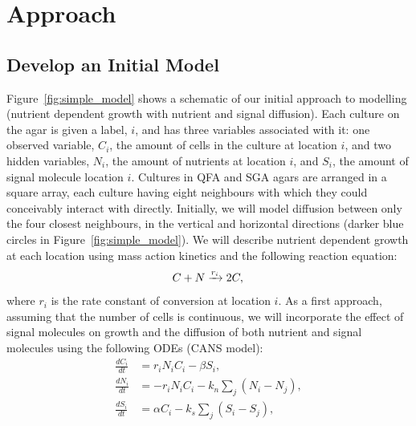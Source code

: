 \graphicspath{{images_low_res/}}
\section{Approach}
\label{sec:approach}

\subsection{Develop an Initial Model}
\label{sec:initial_model}



Figure~\ref{fig:simple_model} shows a schematic of our initial approach to modelling (nutrient dependent growth with nutrient and signal diffusion).
Each culture on the agar is given a label, \(i\), and has three variables associated with it: one observed variable, \(C_{i}\), the amount of cells in the culture at location \(i\), and two hidden variables, \(N_{i}\), the amount of nutrients at location \(i\), and \(S_{i}\), the amount of signal molecule location \(i\).
Cultures in QFA and SGA agars are arranged in a square array, each culture having eight neighbours with which they could conceivably interact with directly. Initially, we will model diffusion between only the four closest neighbours, in the vertical and horizontal directions (darker blue circles in Figure~\ref{fig:simple_model}).
We will describe nutrient dependent growth at each location using mass action kinetics and the following reaction equation:
\begin{equation}
  \label{eq:1}
  C + N \xrightarrow[]{r_{i}} 2C,\\
\end{equation}
where \(r_{i}\) is the rate constant of conversion at location \(i\).
As a first approach, assuming that the number of cells is continuous, we will incorporate the effect of signal molecules on growth and the diffusion of both nutrient and signal molecules using the following ODEs (CANS model):
\begin{subequations}
  \label{eq:2}
  \begin{align}
    \frac{dC_{i}}{dt}& = r_{i}N_{i}C_{i} - \beta S_{i},\\
    \frac{dN_{i}}{dt}& = - r_{i}N_{i}C_{i} - k_{n}\sum_{j}(N_{i} - N_{j}),\\
    \frac{dS_{i}}{dt}& = \alpha C_{i} - k_{s}\sum_{j}(S_{i} - S_{j}),
  \end{align}
\end{subequations}
